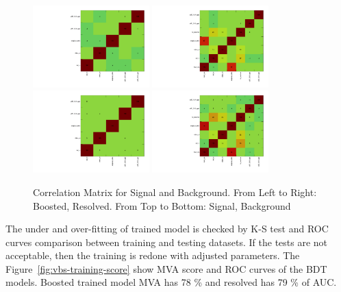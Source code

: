 \begin{figure}[!ht]
  \centering
  \includegraphics[width=0.4\textwidth]{analysis_plots/tmva_plots/zv_BDTG14_CorrelationMatrixS.pdf}
  \includegraphics[width=0.4\textwidth]{analysis_plots/tmva_plots/zjj_BDTG14_CorrelationMatrixS.pdf} \\
  \includegraphics[width=0.4\textwidth]{analysis_plots/tmva_plots/zv_BDTG14_CorrelationMatrixB.pdf}
  \includegraphics[width=0.4\textwidth]{analysis_plots/tmva_plots/zjj_BDTG14_CorrelationMatrixB.pdf} \\
  \caption[Correlation Matrix for Signal and Background]%
  {Correlation Matrix for Signal and Background. From Left to Right: Boosted, Resolved.
    From Top to Bottom: Signal, Background}%
  \label{fig:vbs-training-correlation}
\end{figure}

The under and over-fitting of trained model is checked by \gls{K-S} test
and \gls{ROC} curves comparison between training and testing datasets.
If the tests are not acceptable, then the training is redone with adjusted parameters.
The Figure~\ref{fig:vbs-training-score} show \gls{MVA} score and \gls{ROC} curves
of the BDT models. Boosted trained model \gls{MVA} has 78 \% and resolved
has 79 \% of \gls{AUC}.

